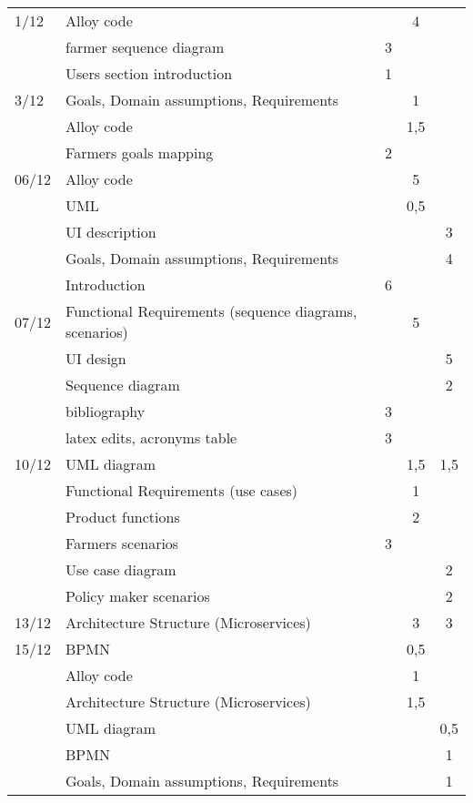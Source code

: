 \begin{center}
\begin{longtable}{llccc}
        \hline
        1/12	&	Alloy code	&		&	4	&		\\
        	&	farmer sequence diagram	&	3	&		&		\\
        	&	Users section introduction	&	1	&		&		\\
        \hline
        3/12	&	Goals, Domain assumptions, Requirements	&		&	1	&		\\
        	&	Alloy code	&		&	1,5	&		\\
        	&	Farmers goals mapping	&	2	&		&		\\
        \hline
        06/12	&	Alloy code	&		&	5	&		\\
        	&	UML	&		&	0,5	&		\\
        	&	UI description	&		&		&	3	\\
        	&	Goals, Domain assumptions, Requirements	&		&		&	4	\\
        	&	Introduction	&	6	&		&		\\
        \hline
        07/12	&	Functional Requirements (sequence diagrams, scenarios)	&		&	5	&		\\
        	&	UI design	&		&		&	5	\\
        	&	Sequence diagram	&		&		&	2	\\
        	&	bibliography	&	3	&		&		\\
        	&	latex edits, acronyms table	&	3	&		&		\\
        \hline
        10/12	&	UML diagram	&		&	1,5	&	1,5	\\
        	&	Functional Requirements (use cases)	&		&	1	&		\\
        	&	Product functions	&		&	2	&		\\
        	&	Farmers scenarios	&	3	&		&		\\
        	&	Use case diagram	&		&		&	2	\\
        	&	Policy maker scenarios	&		&		&	2	\\
        \hline
        13/12	&	Architecture Structure (Microservices)	&		&	3	&	3	\\
        \hline
        15/12	&	BPMN	&		&	0,5	&		\\
        	&	Alloy code	&		&	1	&		\\
        	&	Architecture Structure (Microservices)	&		&	1,5	&		\\
        	&	UML diagram	&		&		&	0,5	\\
        	&	BPMN	&		&		&	1	\\
        	&	Goals, Domain assumptions, Requirements	&		&		&	1	\\

\end{longtable}
\end{center}

